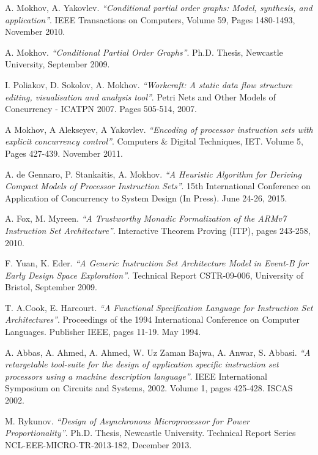 \documentclass[conference]{IEEEtran}
\begin{document}

\begin{thebibliography}{10}

	A. Mokhov, A. Yakovlev. \emph{``Conditional partial order graphs: Model,
	synthesis, and application''}. IEEE Transactions on Computers, Volume 59,
	Pages 1480-1493, November 2010.
	
	A. Mokhov. \emph{``Conditional Partial Order Graphs''}. Ph.D. Thesis,
	Newcastle University, September 2009.	

	I. Poliakov, D. Sokolov, A. Mokhov. \emph{``Workcraft: A static data flow
	structure editing, visualisation and analysis tool''}. Petri Nets and Other
	Models of Concurrency - ICATPN 2007. Pages 505-514, 2007.
	
	A Mokhov, A Alekseyev, A Yakovlev. \emph{``Encoding of processor instruction
	sets with explicit concurrency control''}. Computers \& Digital Techniques,
	IET. Volume 5, Pages 427-439. November 2011.
	
	A. de Gennaro, P. Stankaitis, A. Mokhov. \emph{``A Heuristic Algorithm for
	Deriving Compact Models of Processor Instruction Sets''}. 15th International
	Conference on Application of Concurrency to System Design (In Press). June
	24-26, 2015.

	A. Fox, M. Myreen. \emph{``A Trustworthy Monadic Formalization of the ARMv7
	Instruction Set Architecture''}. Interactive Theorem Proving (ITP), pages
	243-258, 2010.	
	
	F. Yuan, K. Eder. \emph{``A Generic Instruction Set Architecture Model in
	Event-B for Early Design Space Exploration''}. Technical Report CSTR-09-006,
	University of Bristol, September 2009.

	T. A.Cook, E. Harcourt. \emph{``A Functional Specification Language for
	Instruction Set Architectures''}. Proceedings of the 1994 International
	Conference on Computer Languages. Publisher IEEE, pages 11-19. May 1994.
	
	A. Abbas, A. Ahmed, A. Ahmed, W. Uz Zaman Bajwa, A. Anwar, S. Abbasi. 
	\emph{``A retargetable tool-suite for the design of application specific
	instruction set processors using a machine description language''}. IEEE
	International Symposium on Circuits and Systems, 2002. Volume 1, pages 425-428.
	ISCAS 2002.
	
	M. Rykunov. \emph{``Design of Asynchronous Microprocessor for Power
	Proportionality''}. Ph.D. Thesis, Newcastle University. Technical Report Series
	NCL-EEE-MICRO-TR-2013-182, December 2013.
	

\end{thebibliography}
\end{document}
